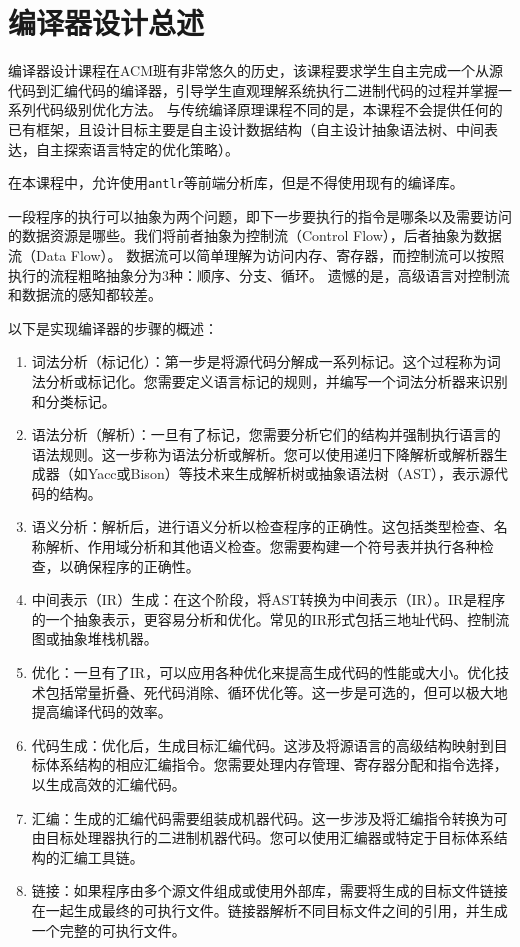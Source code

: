 \chapter{编译器设计总述}

编译器设计课程在ACM班有非常悠久的历史，该课程要求学生自主完成一个从源代码到汇编代码的编译器，引导学生直观理解系统执行二进制代码的过程并掌握一系列代码级别优化方法。
与传统编译原理课程不同的是，本课程不会提供任何的已有框架，且设计目标主要是自主设计数据结构（自主设计抽象语法树、中间表达，自主探索语言特定的优化策略）。

\begin{remark}
    在本课程中，允许使用\texttt{antlr}等前端分析库，但是不得使用现有的编译库。
\end{remark}

一段程序的执行可以抽象为两个问题，即下一步要执行的指令是哪条以及需要访问的数据资源是哪些。我们将前者抽象为控制流（Control Flow），后者抽象为数据流（Data Flow）。
数据流可以简单理解为访问内存、寄存器，而控制流可以按照执行的流程粗略抽象分为3种：顺序、分支、循环。
遗憾的是，高级语言对控制流和数据流的感知都较差。

以下是实现编译器的步骤的概述：

\begin{enumerate}
    \item 词法分析（标记化）：第一步是将源代码分解成一系列标记。这个过程称为词法分析或标记化。您需要定义语言标记的规则，并编写一个词法分析器来识别和分类标记。
    \item 语法分析（解析）：一旦有了标记，您需要分析它们的结构并强制执行语言的语法规则。这一步称为语法分析或解析。您可以使用递归下降解析或解析器生成器（如Yacc或Bison）等技术来生成解析树或抽象语法树（AST），表示源代码的结构。
    \item 语义分析：解析后，进行语义分析以检查程序的正确性。这包括类型检查、名称解析、作用域分析和其他语义检查。您需要构建一个符号表并执行各种检查，以确保程序的正确性。
    \item 中间表示（IR）生成：在这个阶段，将AST转换为中间表示（IR）。IR是程序的一个抽象表示，更容易分析和优化。常见的IR形式包括三地址代码、控制流图或抽象堆栈机器。
    \item 优化：一旦有了IR，可以应用各种优化来提高生成代码的性能或大小。优化技术包括常量折叠、死代码消除、循环优化等。这一步是可选的，但可以极大地提高编译代码的效率。
    \item 代码生成：优化后，生成目标汇编代码。这涉及将源语言的高级结构映射到目标体系结构的相应汇编指令。您需要处理内存管理、寄存器分配和指令选择，以生成高效的汇编代码。
    \item 汇编：生成的汇编代码需要组装成机器代码。这一步涉及将汇编指令转换为可由目标处理器执行的二进制机器代码。您可以使用汇编器或特定于目标体系结构的汇编工具链。
    \item 链接：如果程序由多个源文件组成或使用外部库，需要将生成的目标文件链接在一起生成最终的可执行文件。链接器解析不同目标文件之间的引用，并生成一个完整的可执行文件。
\end{enumerate}